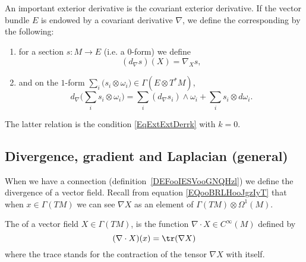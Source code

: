 An important exterior derivative is the covariant exterior derivative. If the vector bundle $E$ is endowed by a covariant derivative $\nabla$, we define the corresponding  by the following:
{
\renewcommand{\theenumi}{\arabic{enumi}.}
\begin{enumerate}
\item for a section $s\colon M\to E$ (i.e. a $0$-form) we define
\begin{equation}
   (d_{\nabla}s)(X)=\nabla_Xs,
\end{equation}
\item and on the $1$-form $\sum_i(s_i\otimes\omega_i \big)\in\Gamma(E\otimes T^*M)$,
\begin{equation}
d_{\nabla}\big( \sum_is_i\otimes\omega_i \big)=\sum_i(d_{\nabla}s_i)\wedge\omega_i+\sum_is_i\otimes d\omega_i.
\end{equation}
\end{enumerate}
}		%
The latter relation is the condition \eqref{EqExtExtDerrk} with $k=0$.

\subsection{Divergence, gradient and Laplacian (general)}

When we have a connection (definition~\ref{DEFooIESVooGNQHzl}) we define the divergence of a vector field. Recall from equation \eqref{EQooBRLHooJgzIyT} that when \( x\in\Gamma(TM)\) we can see \( \nabla X\) as an element of \( \Gamma(TM)\otimes \Omega^1(M)\).
\begin{definition}      \label{DEFooTTSFooDdgiKg}
    The  of a vector field $X\in \Gamma(TM)$, is the function $\nabla\cdot X\in C^{\infty}(M)$ defined by
    \begin{equation}
      (\nabla\cdot X)(x)=\tr(\nabla X)
    \end{equation}
    where the trace stands for the contraction of the tensor \( \nabla X\) with itself.
\end{definition}

